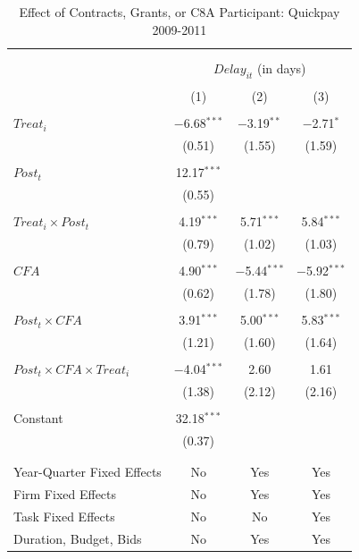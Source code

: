 \documentclass[
]{article}
\begin{document}
\begin{table}[H] \centering 
  \caption{Effect of Contracts, Grants, or C8A Participant: Quickpay 2009-2011} 
  \label{} 
\small 
\begin{tabular}{@{\extracolsep{-2pt}}lccc} 
\\[-1.8ex]\hline 
\hline \\[-1.8ex] 
\\[-1.8ex] & \multicolumn{3}{c}{$Delay_{it}$ (in days)} \\ 
\\[-1.8ex] & (1) & (2) & (3)\\ 
\hline \\[-1.8ex] 
 $Treat_i$ & $-$6.68$^{***}$ & $-$3.19$^{**}$ & $-$2.71$^{*}$ \\ 
  & (0.51) & (1.55) & (1.59) \\ 
  & & & \\ 
 $Post_t$ & 12.17$^{***}$ &  &  \\ 
  & (0.55) &  &  \\ 
  & & & \\ 
 $Treat_i \times Post_t$ & 4.19$^{***}$ & 5.71$^{***}$ & 5.84$^{***}$ \\ 
  & (0.79) & (1.02) & (1.03) \\ 
  & & & \\ 
 $CFA$ & 4.90$^{***}$ & $-$5.44$^{***}$ & $-$5.92$^{***}$ \\ 
  & (0.62) & (1.78) & (1.80) \\ 
  & & & \\ 
 $Post_t \times CFA$ & 3.91$^{***}$ & 5.00$^{***}$ & 5.83$^{***}$ \\ 
  & (1.21) & (1.60) & (1.64) \\ 
  & & & \\ 
 $Post_t \times CFA \times Treat_i$ & $-$4.04$^{***}$ & 2.60 & 1.61 \\ 
  & (1.38) & (2.12) & (2.16) \\ 
  & & & \\ 
 Constant & 32.18$^{***}$ &  &  \\ 
  & (0.37) &  &  \\ 
  & & & \\ 
\hline \\[-1.8ex] 
Year-Quarter Fixed Effects & No & Yes & Yes \\ 
Firm Fixed Effects & No & Yes & Yes \\ 
Task Fixed Effects & No & No & Yes \\ 
Duration, Budget, Bids & No & Yes & Yes \\ 

\end{tabular}
\end{table}
\end{document}
